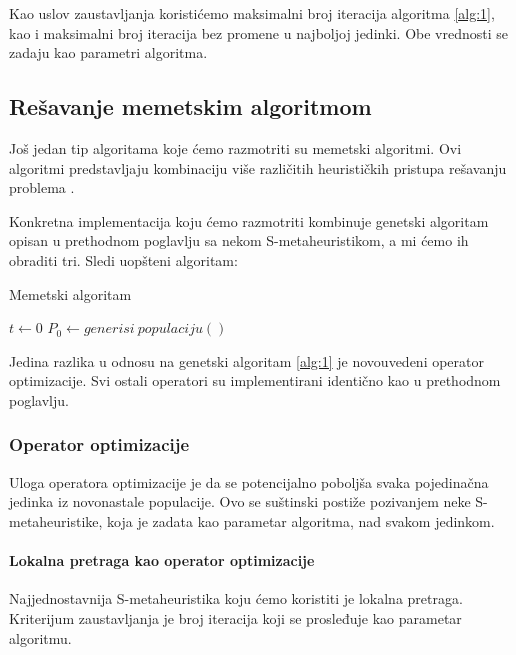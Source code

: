 \documentclass[12pt, a4paper]{article}
\theoremstyle{definition}
\begin{document}
Kao uslov zaustavljanja koristićemo maksimalni broj iteracija algoritma \ref{alg:1}, kao i maksimalni broj iteracija bez promene u najboljoj jedinki. Obe vrednosti se zadaju kao parametri algoritma.

\subsection{Rešavanje memetskim algoritmom}

Još jedan tip algoritama koje ćemo razmotriti su memetski algoritmi. Ovi algoritmi predstavljaju kombinaciju više različitih heurističkih pristupa rešavanju problema \cite{4}.

Konkretna implementacija koju ćemo razmotriti kombinuje genetski algoritam opisan u prethodnom poglavlju sa nekom S-metaheuristikom, a mi ćemo ih obraditi tri. Sledi uopšteni algoritam:

\begin{algorithm}
\caption{Memetski algoritam}
\label{alg:2}
$t \gets 0$\;
$P_0 \gets generisi\ populaciju()$\;
\end{algorithm}

Jedina razlika u odnosu na genetski algoritam \ref{alg:1} je novouvedeni operator optimizacije. Svi ostali operatori su implementirani identično kao u prethodnom poglavlju.

\subsubsection{Operator optimizacije}

Uloga operatora optimizacije je da se potencijalno poboljša svaka pojedinačna jedinka iz novonastale populacije. Ovo se suštinski postiže pozivanjem neke S-metaheuristike, koja je zadata kao parametar algoritma, nad svakom jedinkom.

\paragraph{Lokalna pretraga kao operator optimizacije}

Najjednostavnija S-metaheuristika koju ćemo koristiti je lokalna pretraga. Kriterijum zaustavljanja je broj iteracija koji se prosleđuje kao parametar algoritmu.

\vspace{5mm}
\end{document}
